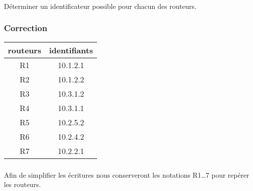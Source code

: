 \documentclass[svgnames,11pt]{beamer}
\begin{document}
\begin{frame}
    \frametitle{}

    \begin{activite}
        Déterminer un identificateur possible pour chacun des routeurs.
    \end{activite}

\end{frame}
\begin{frame}
    \frametitle{Correction}

    \begin{center}
        \begin{tabular}{|*{2}{c|}}
            \hline
            routeurs & identifiants \\
            \hline
            R1       & 10.1.2.1     \\
            R2       & 10.1.2.2     \\
            R3       & 10.3.1.2     \\
            R4       & 10.3.1.1     \\
            R5       & 10.2.5.2     \\
            R6       & 10.2.4.2     \\
            R7       & 10.2.2.1     \\
            \hline
        \end{tabular}
    \end{center}
\end{frame}
\begin{frame}
    \frametitle{}

    Afin de simplifier les écritures nous conserveront les notations R1\dots 7 pour repérer les routeurs.

\end{frame}
\end{document}
